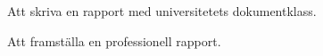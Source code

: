 \item Att skriva en rapport med universitetets dokumentklass.
\item Att framställa en professionell rapport.
